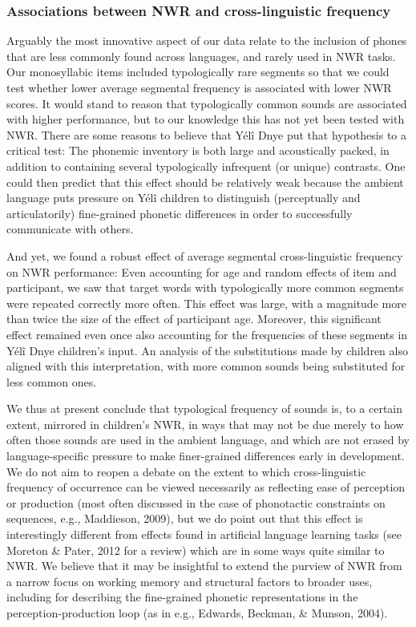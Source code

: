 \documentclass[english,,man,floatsintext]{apa6}
\begin{document}
\hypertarget{associations-between-nwr-and-cross-linguistic-frequency}{%
\subsubsection{Associations between NWR and cross-linguistic frequency}\label{associations-between-nwr-and-cross-linguistic-frequency}}

Arguably the most innovative aspect of our data relate to the inclusion of phones that are less commonly found across languages, and rarely used in NWR tasks. Our monosyllabic items included typologically rare segments so that we could test whether lower average segmental frequency is associated with lower NWR scores. It would stand to reason that typologically common sounds are associated with higher performance, but to our knowledge this has not yet been tested with NWR. There are some reasons to believe that Yélî Dnye put that hypothesis to a critical test: The phonemic inventory is both large and acoustically packed, in addition to containing several typologically infrequent (or unique) contrasts. One could then predict that this effect should be relatively weak because the ambient language puts pressure on Yélî children to distinguish (perceptually and articulatorily) fine-grained phonetic differences in order to successfully communicate with others.

And yet, we found a robust effect of average segmental cross-linguistic frequency on NWR performance: Even accounting for age and random effects of item and participant, we saw that target words with typologically more common segments were repeated correctly more often. This effect was large, with a magnitude more than twice the size of the effect of participant age. Moreover, this significant effect remained even once also accounting for the frequencies of these segments in Yélî Dnye children's input. An analysis of the substitutions made by children also aligned with this interpretation, with more common sounds being substituted for less common ones.

We thus at present conclude that typological frequency of sounds is, to a certain extent, mirrored in children's NWR, in ways that may not be due merely to how often those sounds are used in the ambient language, and which are not erased by language-specific pressure to make finer-grained differences early in development. We do not aim to reopen a debate on the extent to which cross-linguistic frequency of occurrence can be viewed necessarily as reflecting ease of perception or production (most often discussed in the case of phonotactic constraints on sequences, e.g., Maddieson, 2009), but we do point out that this effect is interestingly different from effects found in artificial language learning tasks (see Moreton \& Pater, 2012 for a review) which are in some ways quite similar to NWR. We believe that it may be insightful to extend the purview of NWR from a narrow focus on working memory and structural factors to broader uses, including for describing the fine-grained phonetic representations in the perception-production loop (as in e.g., Edwards, Beckman, \& Munson, 2004).
\end{document}
